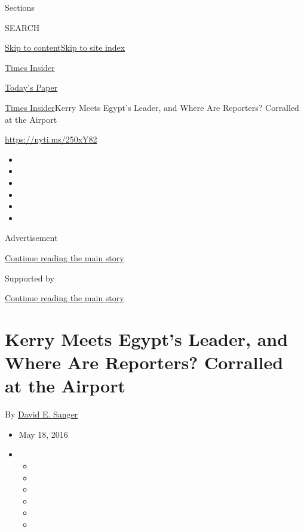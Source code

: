 Sections

SEARCH

\protect\hyperlink{site-content}{Skip to
content}\protect\hyperlink{site-index}{Skip to site index}

\href{https://www.nytimes3xbfgragh.onion/section/reader-center}{Times
Insider}

\href{https://myaccount.nytimes3xbfgragh.onion/auth/login?response_type=cookie\&client_id=vi}{}

\href{https://www.nytimes3xbfgragh.onion/section/todayspaper}{Today's
Paper}

\href{/section/reader-center}{Times Insider}\textbar{}Kerry Meets
Egypt's Leader, and Where Are Reporters? Corralled at the Airport

\url{https://nyti.ms/250xY82}

\begin{itemize}
\item
\item
\item
\item
\item
\item
\end{itemize}

Advertisement

\protect\hyperlink{after-top}{Continue reading the main story}

Supported by

\protect\hyperlink{after-sponsor}{Continue reading the main story}

\hypertarget{kerry-meets-egypts-leader-and-where-are-reporters-corralled-at-the-airport}{%
\section{Kerry Meets Egypt's Leader, and Where Are Reporters? Corralled
at the
Airport}\label{kerry-meets-egypts-leader-and-where-are-reporters-corralled-at-the-airport}}

By \href{http://www.nytimes3xbfgragh.onion/by/david-e-sanger}{David E.
Sanger}

\begin{itemize}
\item
  May 18, 2016
\item
  \begin{itemize}
  \item
  \item
  \item
  \item
  \item
  \item
  \end{itemize}
\end{itemize}

